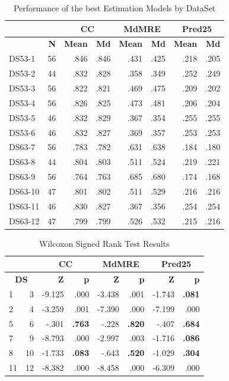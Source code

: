 \documentclass[conference]{IEEEtran}
\begin{document}
\begin{table}
\centering
\caption{Performance of the best Estimation Models by DataSet}
\label{TableModelsDsc}
\begin{tabular}{|l|r|r|r|r|r|r|r|}\hline
&&\multicolumn{2}{c}{\textbf{CC}}& \multicolumn{2}{c}{\textbf{MdMRE}} & \multicolumn{2}{c}{\textbf{Pred25}}\\\hline
\textbf{}&\textbf{N} & \textbf{Mean} & \textbf{Md} & \textbf{Mean} & \textbf{Md} & \textbf{Mean}& \textbf{Md}\\\hline
DS53-1  & 56 & .846  & .846 & .431   & .425   & .218 & .205 \\
DS53-2  & 44 & .832  & .828 & .358   & .349   & .252 & .249 \\
DS53-3  & 56 & .822  & .821 & .469   & .475   & .209 & .202 \\
DS53-4  & 56 & .826  & .825 & .473   & .481   & .206 & .204 \\
DS53-5  & 46 & .832  & .829 & .367   & .354   & .255 & .255 \\
DS53-6  & 46 & .832  & .827 & .369   & .357   & .253 & .253 \\
DS63-7  & 56 & .783  & .782 & .631   & .638   & .184 & .180 \\
DS63-8  & 44 & .804  & .803 & .511   & .524   & .219 & .221 \\
DS63-9  & 56 & .764  & .763 & .685   & .680   & .174 & .168 \\
DS63-10 & 47 & .801  & .802 & .511   & .529   & .216 & .216 \\
DS63-11 & 46 & .830  & .827 & .367   & .356   & .254 & .254 \\
DS63-12 & 47 & .799  & .799 & .526   & .532   & .215 & .216\\\hline 
\end{tabular}
\end{table}

\begin{table}
\centering
\caption{Wilcoxon Signed Rank Test Results}
\label{TableModelsH}
\begin{tabular}{|l|r|r|r|r|r|r|r|}\hline
\multicolumn{2}{c}{}&\multicolumn{2}{c}{\textbf{CC}}& \multicolumn{2}{c}{\textbf{MdMRE}} & \multicolumn{2}{c}{\textbf{Pred25}}\\\hline
\multicolumn{2}{c}{\textbf{DS}} & \textbf{Z} & \textbf{p} & \textbf{Z} & \textbf{p} & \textbf{Z}& \textbf{p}\\\hline
1  & 3  & -9.125 & .000 & -3.438 & .001 & -1.743 & \textbf{.081} \\
2  & 4  & -3.259 & .001 & -7.390 & .000 & -7.199 & .000 \\
5  & 6  & -.301  & \textbf{.763} & -.228  & \textbf{.820} & -.407  & \textbf{.684} \\
7  & 9  & -8.793 & .000 & -2.997 & .003 & -1.716 & \textbf{.086} \\
8  & 10 & -1.733 & \textbf{.083} & -.643  & \textbf{.520} & -1.029 & \textbf{.304} \\
11 & 12 & -8.382 & .000 & -8.458 & .000 & -6.309 & .000\\\hline 
\end{tabular}
\end{table}
\end{document}
